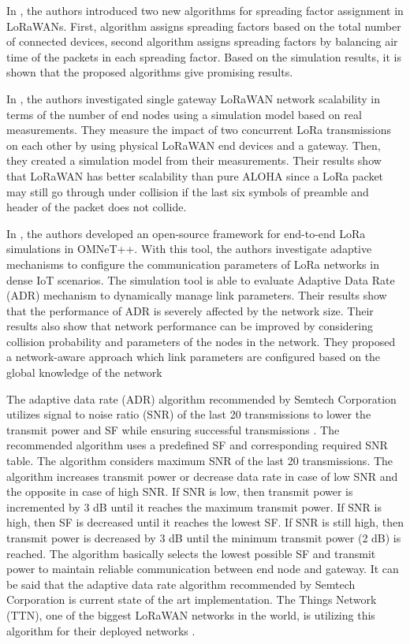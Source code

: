 In \cite{8115779}, the authors introduced two new algorithms for spreading factor assignment in LoRaWANs. First, algorithm assigns spreading factors based on the total number of connected devices, second algorithm assigns spreading factors by balancing air time of the packets in each spreading factor. Based on the simulation results, it is shown that the proposed algorithms give promising results.

In \cite{s17061193}, the authors investigated single gateway LoRaWAN network scalability in terms of the number of end nodes using a simulation model based on real measurements. They measure the impact of two concurrent LoRa transmissions on each other by using physical LoRaWAN end devices and a gateway. Then, they created a simulation model from their measurements. Their results show that LoRaWAN has better scalability than pure ALOHA since a LoRa packet may still go through under collision if the last six symbols of preamble and header of the packet does not collide.

In \cite{8406255}, the authors developed an open-source framework for end-to-end LoRa simulations in OMNeT++. With this tool, the authors investigate adaptive mechanisms to configure the communication parameters of LoRa networks in dense IoT scenarios. The simulation tool is able to evaluate Adaptive Data Rate (ADR) mechanism to dynamically manage link parameters. Their results show that the performance of ADR is severely affected by the network size. Their results also show that network performance can be improved by considering collision probability and  parameters of the nodes in the network. They proposed a network-aware approach which link parameters are configured based on the global knowledge of the network

The adaptive data rate (ADR) algorithm recommended by Semtech Corporation utilizes signal to noise ratio (SNR) of the last 20 transmissions to lower the transmit power and SF while ensuring successful transmissions \cite{lorawan_adr}. The recommended algorithm uses a predefined SF and corresponding required SNR table. The algorithm considers maximum SNR of the last 20 transmissions. The algorithm increases transmit power or decrease data rate in case of low SNR and the opposite in case of high SNR. If SNR is low, then transmit power is incremented by 3 dB until it reaches the maximum transmit power. If SNR is high, then SF is decreased until it reaches the lowest SF. If SNR is still high, then transmit power is decreased by 3 dB until the minimum transmit power (2 dB) is reached. The algorithm basically selects the lowest possible SF and transmit power to maintain reliable communication between end node and gateway. It can be said that the adaptive data rate algorithm recommended by Semtech Corporation is current state of the art implementation. The Things Network (TTN), one of the biggest LoRaWAN networks in the world, is utilizing this algorithm for their deployed networks \cite{ttn_adr}.
